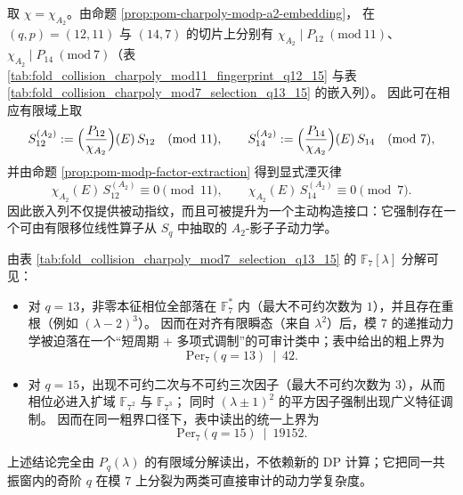 \begin{remark}\label{rem:pom-a2-subrecurrence-extraction}
取 \(\chi=\chi_{A_2}\)。由命题 \ref{prop:pom-charpoly-modp-a2-embedding}，
在 \((q,p)=(12,11)\) 与 \((14,7)\) 的切片上分别有 \(\chi_{A_2}\mid P_{12}\ (\mathrm{mod}\ 11)\)、\(\chi_{A_2}\mid P_{14}\ (\mathrm{mod}\ 7)\)（表 \ref{tab:fold_collision_charpoly_mod11_fingerprint_q12_15} 与表 \ref{tab:fold_collision_charpoly_mod7_selection_q13_15} 的嵌入列）。
因此可在相应有限域上取
\[
S_{12}^{(A_2)}:=\Bigl(\frac{P_{12}}{\chi_{A_2}}\Bigr)(E)\,S_{12}\quad(\mathrm{mod}\ 11),
\qquad
S_{14}^{(A_2)}:=\Bigl(\frac{P_{14}}{\chi_{A_2}}\Bigr)(E)\,S_{14}\quad(\mathrm{mod}\ 7),
\]
并由命题 \ref{prop:pom-modp-factor-extraction} 得到显式湮灭律
\[
\chi_{A_2}(E)\,S_{12}^{(A_2)}\equiv 0\pmod{11},
\qquad
\chi_{A_2}(E)\,S_{14}^{(A_2)}\equiv 0\pmod{7}.
\]
因此嵌入列不仅提供被动指纹，而且可被提升为一个主动构造接口：它强制存在一个可由有限移位线性算子从 \(S_q\) 中抽取的 \(A_2\)-影子子动力学。
\end{remark}

\begin{remark}\label{rem:pom-charpoly-mod7-selection}
由表 \ref{tab:fold_collision_charpoly_mod7_selection_q13_15} 的 \(\mathbb{F}_7[\lambda]\) 分解可见：
\begin{itemize}
  \item 对 \(q=13\)，非零本征相位全部落在 \(\mathbb{F}_7^\ast\) 内（最大不可约次数为 \(1\)），并且存在重根（例如 \((\lambda-2)^3\)）。
  因而在对齐有限瞬态（来自 \(\lambda^2\)）后，模 \(7\) 的递推动力学被迫落在一个“短周期 + 多项式调制”的可审计类中；表中给出的粗上界为
  \[
  \mathrm{Per}_7(q=13)\ \mid\ 42.
  \]
  \item 对 \(q=15\)，出现不可约二次与不可约三次因子（最大不可约次数为 \(3\)），从而相位必进入扩域 \(\mathbb{F}_{7^2}\) 与 \(\mathbb{F}_{7^3}\)；
  同时 \((\lambda\pm 1)^2\) 的平方因子强制出现广义特征调制。
  因而在同一粗界口径下，表中读出的统一上界为
  \[
  \mathrm{Per}_7(q=15)\ \mid\ 19152.
  \]
\end{itemize}
上述结论完全由 \(P_q(\lambda)\) 的有限域分解读出，不依赖新的 DP 计算；它把同一共振窗内的奇阶 \(q\) 在模 \(7\) 上分裂为两类可直接审计的动力学复杂度。
\end{remark}

